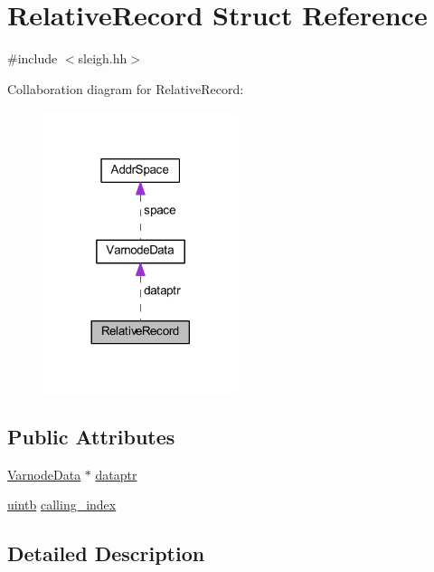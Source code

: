 \hypertarget{struct_relative_record}{}\section{Relative\+Record Struct Reference}
\label{struct_relative_record}


{\ttfamily \#include $<$sleigh.\+hh$>$}



Collaboration diagram for Relative\+Record\+:
\nopagebreak
\begin{figure}[H]
\begin{center}
\leavevmode
\includegraphics[width=161pt]{struct_relative_record__coll__graph}
\end{center}
\end{figure}
\subsection*{Public Attributes}
\begin{DoxyCompactItemize}
\item 
\mbox{\hyperlink{struct_varnode_data}{Varnode\+Data}} $\ast$ \mbox{\hyperlink{struct_relative_record_a850f0350cbee0663232960529ed4f271}{dataptr}}
\item 
\mbox{\hyperlink{types_8h_a2db313c5d32a12b01d26ac9b3bca178f}{uintb}} \mbox{\hyperlink{struct_relative_record_aec0e3f94be30f9591788f7cd45425667}{calling\+\_\+index}}
\end{DoxyCompactItemize}


\subsection{Detailed Description}


